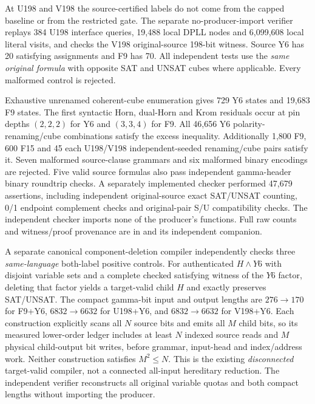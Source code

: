 \documentclass[11pt]{article}
\begin{document}
At U198 and V198 the source-certified labels do not come from the capped baseline or from the restricted gate. The separate no-producer-import verifier replays 384 U198 interface queries, 19,488 local DPLL nodes and 6,099,608 local literal visits, and checks the V198 original-source 198-bit witness. Source Y6 has 20 satisfying assignments and F9 has 70. All independent tests use the \emph{same original formula} with opposite SAT and UNSAT cubes where applicable. Every malformed control is rejected.

Exhaustive unrenamed coherent-cube enumeration gives 729 Y6 states and 19,683 F9 states. The first syntactic Horn, dual-Horn and Krom residuals occur at pin depths $(2,2,2)$ for Y6 and $(3,3,4)$ for F9. All 46,656 Y6 polarity-renaming/cube combinations satisfy the excess inequality. Additionally 1,800 F9, 600 F15 and 45 each U198/V198 independent-seeded renaming/cube pairs satisfy it. Seven malformed source-clause grammars and six malformed binary encodings are rejected. Five valid source formulas also pass independent gamma-header binary roundtrip checks. A separately implemented checker performed 47,679 assertions, including independent original-source exact SAT/UNSAT counting, 0/1 endpoint complement checks and original-pair S/U compatibility checks. The independent checker imports none of the producer's functions. Full raw counts and witness/proof provenance are in  and its independent companion.

A separate canonical component-deletion compiler independently checks three \emph{same-language} both-label positive controls. For authenticated $H\wedge Y6$ with disjoint variable sets and a complete checked satisfying witness of the $Y6$ factor, deleting that factor yields a target-valid child $H$ and exactly preserves SAT/UNSAT. The compact gamma-bit input and output lengths are $276\to170$ for F9+Y6, $6832\to6632$ for U198+Y6, and $6832\to6632$ for V198+Y6. Each construction explicitly scans all $N$ source bits and emits all $M$ child bits, so its measured lower-order ledger includes at least $N$ indexed source reads and $M$ physical child-output bit writes, before grammar, input-head and index/address work. Neither construction satisfies $M^2\le N$. This is the existing \emph{disconnected} target-valid compiler, not a connected all-input hereditary reduction. The independent verifier reconstructs all original variable quotas and both compact lengths without importing the producer.
\end{document}
